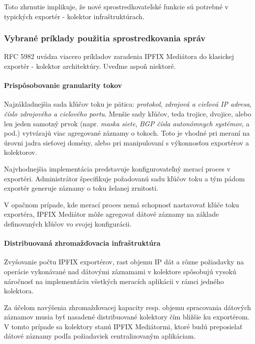 Toto zhrnutie implikuje, že nové sprostredkovateľské funkcie sú potrebné v typických exportér - kolektor
infraštruktúrach. 


\subsubsection{Vybrané príklady použitia sprostredkovania správ} \label{sec:mediator_examples}


RFC 5982 \citep{rfc5982} uvádza viacero príkladov zaradenia IPFIX Mediátora do klasickej
exportér - kolektor architektúry. Uveďme aspoň niektoré.


\paragraph{Prispôsobovanie granularity tokov}

Najzákladnejšia sada kľúčov toku je pätica: \emph{protokol}, \emph{zdrojová a cieľová IP adresa}, 
\emph{číslo zdrojového a cieľového portu}. Menšie sady kľúčov, teda trojice, dvojice, alebo len jeden 
samotný prvok (napr. \emph{maska siete}, \emph{BGP čísla autonómnych systémov}, a pod.) vytvárajú viac 
agregované záznamy o tokoch. Toto je vhodné pri meraní na úrovni 
jadra sieťovej domény, alebo pri manipulovaní s výkonnosťou exportérov a kolektorov.

Najvhodnejšia implementácia predstavuje konfigurovateľný merací proces v exportéri. Administrátor 
špecifikuje požadovanú sadu kľúčov toku a tým pádom exportér generuje záznamy o toku želanej zrnitosti.

V opačnom prípade, kde merací proces nemá schopnosť nastavovať kľúče toku exportéra, IPFIX Mediátor 
môže agregovať dátové záznamy na základe definovaných kľúčov vo svojej konfigurácii.


\paragraph{Distribuovaná zhromažďovacia infraštruktúra}

Zvyšovanie počtu IPFIX exportérov, rast objemu IP dát a rôzne požiadavky na operácie vykonávané nad 
dátovými záznamami v kolektore spôsobujú vysokú náročnosť na implementáciu všetkých meracích
aplikácii v rámci jedného kolektora.

Za účelom navýšenia zhromažďovacej kapacity resp. objemu spracovania dátových záznamov musia byť 
nasadené distribuované kolektory čím bližšie ku exportérom. V tomto prípade sa kolektory stanú 
IPFIX Mediátormi, ktoré budú preposielať dátové záznamy podľa požiadaviek centralizovaným aplikáciam.



